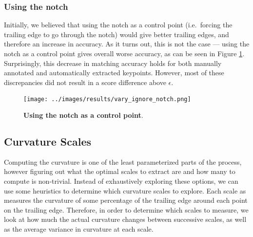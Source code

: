 \subsubsection{Using the notch}

Initially, we believed that using the notch as a control point (i.e.\ forcing the trailing edge to go through the notch) would give better trailing edges, and therefore an increase in accuracy.
As it turns out, this is not the case --- using the notch as a control point gives overall worse accuracy, as can be seen in Figure \ref{fig:vary_notch}.
Surprisingly, this decrease in matching accuracy holds for both manually annotated and automatically extracted keypoints.
However, most of these discrepancies did not result in a score difference above $\epsilon$.

\begin{figure}[t]%
\centering
\texttt{[image: ../images/results/vary\_ignore\_notch.png]}
\caption{\textbf{Using the notch as a control point}.}
\label{fig:vary_notch}
\end{figure}

\subsection{Curvature Scales}

Computing the curvature is one of the least parameterized parts of the process, however figuring out what the optimal scales to extract are and how many to compute is non-trivial.
Instead of exhaustively exploring these options, we can use some heuristics to determine which curvature scales to explore.
Each scale as measures the curvature of some percentage of the trailing edge around each point on the trailing edge.
Therefore, in order to determine which scales to measure, we look at how much the actual curvature changes between successive scales, as well as the average variance in curvature at each scale. 

